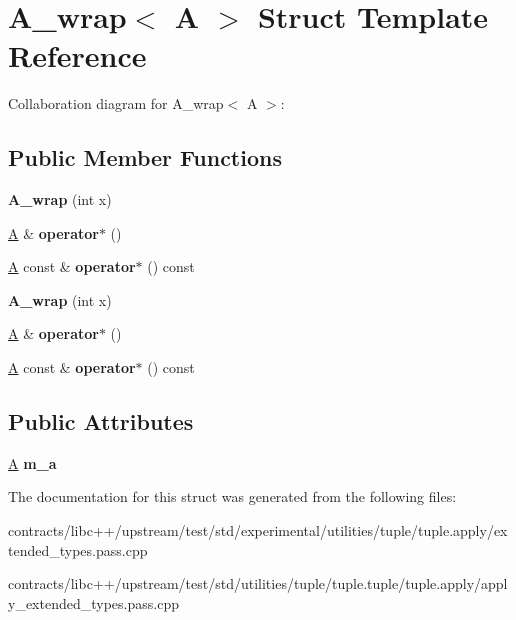 \hypertarget{struct_a__wrap}{}\section{A\+\_\+wrap$<$ A $>$ Struct Template Reference}
\label{struct_a__wrap}


Collaboration diagram for A\+\_\+wrap$<$ A $>$\+:
\subsection*{Public Member Functions}
\begin{DoxyCompactItemize}
\item 
\mbox{\label{struct_a__wrap_a727447dd3febf1e0d87bc646140e881c}} 
{\bfseries A\+\_\+wrap} (int x)
\item 
\mbox{\label{struct_a__wrap_af776bf5fffa77c6fa0986934480b5518}} 
\mbox{\hyperlink{struct_a}{A}} \& {\bfseries operator$\ast$} ()
\item 
\mbox{\label{struct_a__wrap_a804983d98c7e1cf7ec9601d56bdbca8e}} 
\mbox{\hyperlink{struct_a}{A}} const  \& {\bfseries operator$\ast$} () const
\item 
\mbox{\label{struct_a__wrap_a727447dd3febf1e0d87bc646140e881c}} 
{\bfseries A\+\_\+wrap} (int x)
\item 
\mbox{\label{struct_a__wrap_af776bf5fffa77c6fa0986934480b5518}} 
\mbox{\hyperlink{struct_a}{A}} \& {\bfseries operator$\ast$} ()
\item 
\mbox{\label{struct_a__wrap_a804983d98c7e1cf7ec9601d56bdbca8e}} 
\mbox{\hyperlink{struct_a}{A}} const  \& {\bfseries operator$\ast$} () const
\end{DoxyCompactItemize}
\subsection*{Public Attributes}
\begin{DoxyCompactItemize}
\item 
\mbox{\label{struct_a__wrap_a7f094d00cadb817566817e647a627a47}} 
\mbox{\hyperlink{struct_a}{A}} {\bfseries m\+\_\+a}
\end{DoxyCompactItemize}


The documentation for this struct was generated from the following files\+:\begin{DoxyCompactItemize}
\item 
contracts/libc++/upstream/test/std/experimental/utilities/tuple/tuple.\+apply/extended\+\_\+types.\+pass.\+cpp\item 
contracts/libc++/upstream/test/std/utilities/tuple/tuple.\+tuple/tuple.\+apply/apply\+\_\+extended\+\_\+types.\+pass.\+cpp\end{DoxyCompactItemize}
